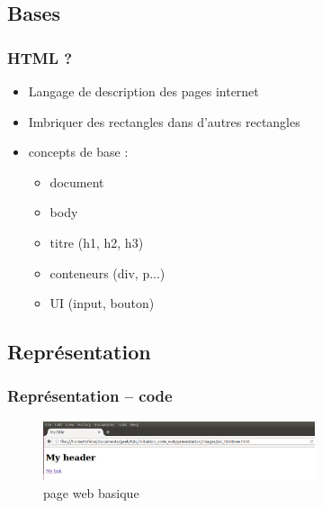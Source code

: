 \documentclass{beamer}
\newenvironment{code}{\captionsetup{type=listing}}{}
\begin{document}
	\subsection{Bases}
	\begin{frame}
		\frametitle{HTML ?}
		\begin{itemize}
			\item Langage de description des pages internet
			\item Imbriquer des rectangles dans d'autres rectangles
			\item concepts de base : 
				\begin{itemize}
					\item document
					\item body
					\item titre (h1, h2, h3)
					\item conteneurs (div, p...)
					\item UI (input, bouton)
				\end{itemize}
		\end{itemize}
    \end{frame}

	\subsection{Représentation}

	\begin{frame}[fragile]
		\frametitle{Représentation -- code}

		\begin{figure}
			\includegraphics[width=8cm]{images/page_html.png}
			\caption{page web basique}	
		\end{figure}
		
		\begin{code}
			\inputminted{html}{images/pic_htmltree.html}
		\end{code}				
		
	\end{frame}		
\end{document}
